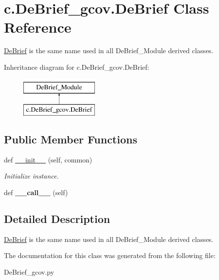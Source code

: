 \hypertarget{classc_1_1_de_brief__gcov_1_1_de_brief}{}\section{c.\+De\+Brief\+\_\+gcov.\+De\+Brief Class Reference}
\label{classc_1_1_de_brief__gcov_1_1_de_brief}


\hyperlink{classc_1_1_de_brief__gcov_1_1_de_brief}{De\+Brief} is the same name used in all De\+Brief\+\_\+\+Module derived classes.  


Inheritance diagram for c.\+De\+Brief\+\_\+gcov.\+De\+Brief\+:\begin{figure}[H]
\begin{center}
\leavevmode
\includegraphics[height=2.000000cm]{classc_1_1_de_brief__gcov_1_1_de_brief}
\end{center}
\end{figure}
\subsection*{Public Member Functions}
\begin{DoxyCompactItemize}
\item 
\hypertarget{classc_1_1_de_brief__gcov_1_1_de_brief_ace3e866253de7f946d930b66798d369e}{}def \hyperlink{classc_1_1_de_brief__gcov_1_1_de_brief_ace3e866253de7f946d930b66798d369e}{\+\_\+\+\_\+init\+\_\+\+\_\+} (self, common)\label{classc_1_1_de_brief__gcov_1_1_de_brief_ace3e866253de7f946d930b66798d369e}

\begin{DoxyCompactList}\small\item\em Initialize instance. \end{DoxyCompactList}\item 
\hypertarget{classc_1_1_de_brief__gcov_1_1_de_brief_a9f64436f89bf3ecf15117efd6f7efe09}{}def {\bfseries \+\_\+\+\_\+call\+\_\+\+\_\+} (self)\label{classc_1_1_de_brief__gcov_1_1_de_brief_a9f64436f89bf3ecf15117efd6f7efe09}

\end{DoxyCompactItemize}


\subsection{Detailed Description}
\hyperlink{classc_1_1_de_brief__gcov_1_1_de_brief}{De\+Brief} is the same name used in all De\+Brief\+\_\+\+Module derived classes. 



The documentation for this class was generated from the following file\+:\begin{DoxyCompactItemize}
\item 
De\+Brief\+\_\+gcov.\+py\end{DoxyCompactItemize}
